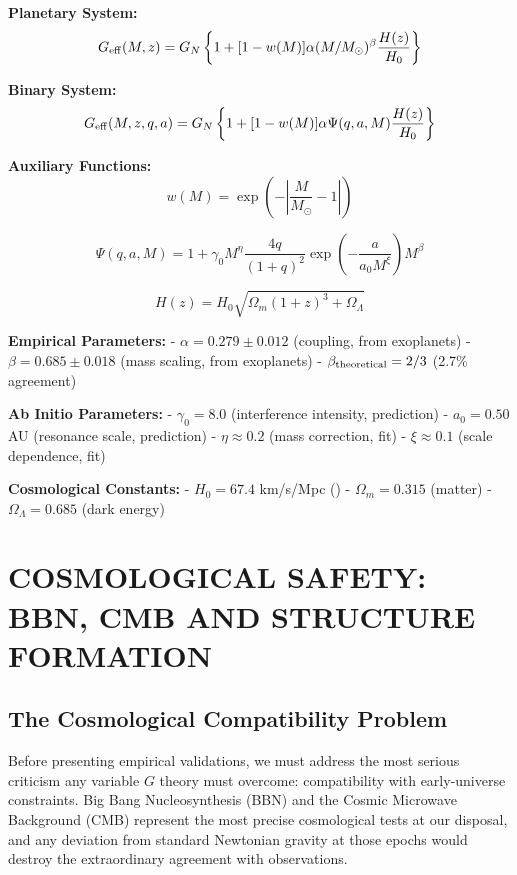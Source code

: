\documentclass[11pt,a4paper]{article}
\begin{document}
\textbf{Planetary System:}
\[G_{\rm eff}(M,z) = G_N \left\{1 + [1-w(M)] \alpha (M/M_\odot)^\beta \frac{H(z)}{H_0}\right\}\]

\textbf{Binary System:}
\[G_{\rm eff}(M,z,q,a) = G_N \left\{1 + [1-w(M)] \alpha \Psi(q,a,M) \frac{H(z)}{H_0}\right\}\]

\textbf{Auxiliary Functions:}
\[w(M) = \exp\left(-\left|\frac{M}{M_\odot}-1\right|\right)\]

\[\Psi(q,a,M) = 1 + \gamma_0 M^\eta \frac{4q}{(1+q)^2} \exp\left(-\frac{a}{a_0 M^\xi}\right) M^\beta\]

\[H(z) = H_0 \sqrt{\Omega_m(1+z)^3 + \Omega_\Lambda}\]

\textbf{Empirical Parameters:} - \(\alpha = 0.279 \pm 0.012\) (coupling,
from exoplanets) - \(\beta = 0.685 \pm 0.018\) (mass scaling, from
exoplanets) - \(\beta_{\rm theoretical} = 2/3\) (2.7\% agreement)

\textbf{Ab Initio Parameters:} - \(\gamma_0 = 8.0\) (interference
intensity, prediction) - \(a_0 = 0.50\) AU (resonance scale, prediction)
- \(\eta \approx 0.2\) (mass correction, fit) - \(\xi \approx 0.1\)
(scale dependence, fit)

\textbf{Cosmological Constants:} - \(H_0 = 67.4\) km/s/Mpc (\cite{PlanckCollaboration2020a})
- \(\Omega_m = 0.315\) (matter) - \(\Omega_\Lambda = 0.685\) (dark
energy)

\hypertarget{cosmological-safety-bbn-cmb-and-structure-formation}{%
\section{COSMOLOGICAL SAFETY: BBN, CMB AND STRUCTURE
FORMATION}\label{cosmological-safety-bbn-cmb-and-structure-formation}}

\hypertarget{the-cosmological-compatibility-problem}{%
\subsection{The Cosmological Compatibility
Problem}\label{the-cosmological-compatibility-problem}}

Before presenting empirical validations, we must address the most
serious criticism any variable \(G\) theory must overcome: compatibility
with early-universe constraints. Big Bang Nucleosynthesis (BBN) and the
Cosmic Microwave Background (CMB) represent the most precise
cosmological tests at our disposal, and any deviation from standard
Newtonian gravity at those epochs would destroy the extraordinary
agreement with observations.
\end{document}

